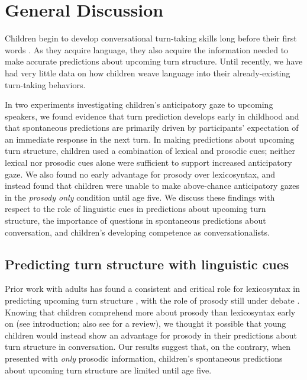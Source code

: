 \documentclass[authoryear, 12pt]{elsarticle}
\begin{document}
\section{General Discussion}
\label{sec:gendisc}

Children begin to develop conversational turn-taking skills long before their first words \citep{bateson1975, hilbrink2015, jaffe2001, snow1977}. As they acquire language, they also acquire the information needed to make accurate predictions about upcoming turn structure. Until recently, we have had very little data on how children weave language into their already-existing turn-taking behaviors. 

In two experiments investigating children's anticipatory gaze to upcoming speakers, we found evidence that turn prediction develops early in childhood and that spontaneous predictions are primarily driven by participants' expectation of an immediate response in the next turn. In making predictions about upcoming turn structure, children used a combination of lexical and prosodic cues; neither lexical nor prosodic cues alone were sufficient to support increased anticipatory gaze. We also found no early advantage for prosody over lexicosyntax, and instead found that children were unable to make above-chance anticipatory gazes in the \textit{prosody only} condition until age five. We discuss these findings with respect to the role of linguistic cues in predictions about upcoming turn structure, the importance of questions in spontaneous predictions about conversation, and children's developing competence as conversationalists.

\subsection{Predicting turn structure with linguistic cues}

Prior work with adults has found a consistent and critical role for lexicosyntax in predicting upcoming turn structure \citep{de-ruiter2006, magyari2012}, with the role of prosody still under debate \citep{duncan1972, ford1996, torreira2015}. Knowing that children comprehend more about prosody than lexicosyntax early on (see introduction; also see \citealp{speer2009} for a review), we thought it possible that young children would instead show an advantage for prosody in their predictions about turn structure in conversation. Our results suggest that, on the contrary, when presented with \textit{only} prosodic information, children's spontaneous predictions about upcoming turn structure are limited until age five.
\end{document}
